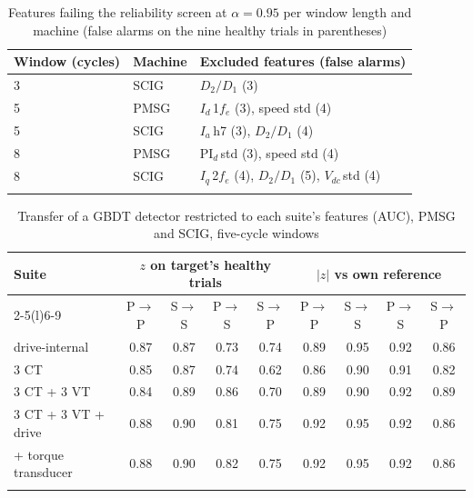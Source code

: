 \begin{table}[t]
\tabsize
\caption{Features failing the reliability screen at $\alpha=0.95$ per window length and machine (false alarms on the nine healthy trials in parentheses)}\label{tab:screen}
\begin{tabular}{@{}llp{8cm}@{}}
\toprule
Window (cycles) & Machine & Excluded features (false alarms) \\
\midrule
3 & SCIG & $D_2/D_1$ (3) \\
5 & PMSG & $I_d$\,1$f_e$ (3), speed std (4) \\
5 & SCIG & $I_a$\,h7 (3), $D_2/D_1$ (4) \\
8 & PMSG & PI$_d$\,std (3), speed std (4) \\
8 & SCIG & $I_q$\,2$f_e$ (4), $D_2/D_1$ (5), $V_{dc}$\,std (4) \\
\botrule
\end{tabular}
\end{table}

\begin{table}[t]
\tabsize
\setlength{\tabcolsep}{3pt}
\caption{Transfer of a GBDT detector restricted to each suite's features (AUC), PMSG and SCIG, five-cycle windows}\label{tab:suitetransfer}
\begin{tabular}{@{}lcccccccc@{}}
\toprule
\multirow{2}{*}{Suite} & \multicolumn{4}{c}{$z$ on target's healthy trials} & \multicolumn{4}{c}{$|z|$ vs own reference} \\
\cmidrule(lr){2-5}\cmidrule(l){6-9}
 & P$\to$P & S$\to$S & P$\to$S & S$\to$P & P$\to$P & S$\to$S & P$\to$S & S$\to$P \\
\midrule
drive-internal & 0.87 & 0.87 & 0.73 & 0.74 & 0.89 & 0.95 & 0.92 & 0.86 \\
3 CT & 0.85 & 0.87 & 0.74 & 0.62 & 0.86 & 0.90 & 0.91 & 0.82 \\
3 CT + 3 VT & 0.84 & 0.89 & 0.86 & 0.70 & 0.89 & 0.90 & 0.92 & 0.89 \\
3 CT + 3 VT + drive & 0.88 & 0.90 & 0.81 & 0.75 & 0.92 & 0.95 & 0.92 & 0.86 \\
+ torque transducer & 0.88 & 0.90 & 0.82 & 0.75 & 0.92 & 0.95 & 0.92 & 0.86 \\
\botrule
\end{tabular}
\end{table}
